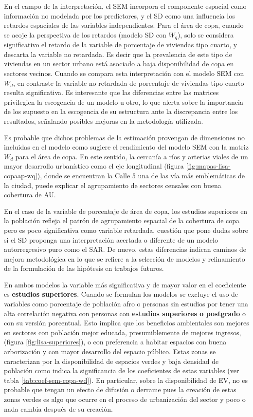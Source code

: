 \documentclass[12pt,a4paper,openany]{book}
\theoremstyle{definition}
\theoremstyle{definition}
\theoremstyle{definition}
\theoremstyle{remark}
\begin{document}
En el campo de la interpretación, el SEM incorpora el componente
espacial como información no modelada por los predictores, y el SD como
una influencia los retardos espaciales de las variables independientes.
Para el área de copa, cuando se acoje la perspectiva de los retardos
(modelo SD con \(W_q\)), solo se considera significativo el retardo de
la variable de porcentaje de viviendas tipo cuarto, y descarta la
variable no retardada. Es decir que la prevalencia de este tipo de
viviendas en un sector urbano está asociado a baja disponibilidad de
copa en sectores vecinos. Cuando se compara esta interpretación con el
modelo SEM con \(W_d\), en contraste la variable no retardada de
porcentaje de viviendas tipo cuarto resulta significativa. Es
interesante que las diferencias entre las matrices privilegien la
escogencia de un modelo u otro, lo que alerta sobre la importancia de
los supuesto en la escogencia de su estructura ante la discrepancia
entre los resultados, señalando posibles mejoras en la metodología
utilizada.

Es probable que dichos problemas de la estimación provengan de
dimensiones no incluidas en el modelo como sugiere el rendimiento del
modelo SEM con la matriz \(W_d\) para el área de copa. En este sentido,
la cercanía a ríos y arterias viales de un mayor desarrollo urbanístico
como el eje longitudinal (figura \ref{fig:mapas-lisa-copaap-wq}), donde
se encuentran la Calle 5 una de las vía más emblemáticas de la ciudad,
puede explicar el agrupamiento de sectores censales con buena cobertura
de AU.

En el caso de la variable de porcentaje de área de copa, los estudios
superiores en la población refleja el patrón de agrupamiento espacial de
la cobertura de copa pero es poco significativa como variable retardada,
cuestión que pone dudas sobre si el SD proponga una interpretación
acertada o diferente de un modelo autorregresivo puro como el SAR. De
nuevo, estas diferencias indican caminos de mejora metodológica en lo
que se refiere a la selección de modelos y refinamiento de la
formulación de las hipótesis en trabajos futuros.

En ambos modelos la variable más significativa y de mayor valor en el
coeficiente es \textbf{estudios superiores}. Cuando se formulan los
modelos se excluye el uso de variables como porcentaje de población afro
o personas sin estudios por tener una alta correlación negativa con
personas con \textbf{estudios superiores o postgrado} o con su versión
porcentual. Esto implica que los beneficios ambientales son mejores en
sectores con población mejor educada, presumiblemente de mejores
ingresos, (figura \ref{fig:lisa-superiores}), o con preferencia a
habitar espacios con buena arborización y con mayor desarrollo del
espacio público. Estas zonas se caracterizan por la disponibilidad de
espacios verdes y baja densidad de población como indica la
significancia de los coeficientes de estas variables (ver tabla
\ref{tab:coef-sem-copa-wd}). En particular, sobre la disponibilidad de
EV, no es probable que tengan un efecto de difusión o derrame pues la
creación de estas zonas verdes es algo que ocurre en el proceso de
urbanización del sector y poco o nada cambia después de su creación.
\end{document}
